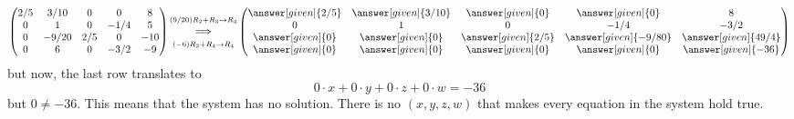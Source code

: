 \documentclass{ximera}
\begin{document}
\begin{example}[No solutions]
\begin{explanation}
\[\begin{pmatrix}
      {2/5}&  {3/10} & {0} &{0} &8 \\
  {0}&  {1} & {0} &{-1/4} & 5\\
  {0}&  {-9/20} & {2/5} &{0} &-10\\
  {0}&  {6} & {0} &{-3/2} &-9
\end{pmatrix}
\begin{matrix}
  \scriptstyle (9/20) R_2 + R_3\to R_3\\
  \Longrightarrow \\
  \scriptstyle(-6) R_2+R_4\to R_4
\end{matrix}
\begin{pmatrix}
   \answer[given]{2/5}&  \answer[given]{3/10} & \answer[given]{0} &\answer[given]{0} &8 \\
  {0}&  {1} & {0} &{-1/4} & -3/2\\
  \answer[given]{0}&  \answer[given]{0} & \answer[given]{2/5} &\answer[given]{-9/80} &\answer[given]{49/4}\\
  \answer[given]{0}&  \answer[given]{0} & \answer[given]{0} &\answer[given]{0} &\answer[given]{-36}
\end{pmatrix}
\]
but now, the last row translates to
\[
0\cdot x+0\cdot y+0\cdot z+0\cdot w=-36
\]
but $0\ne -36$. This means that the system has no solution. There is
no $(x,y,z,w)$ that makes every equation in the system hold true.
\end{explanation}
\end{example}
\end{document}
